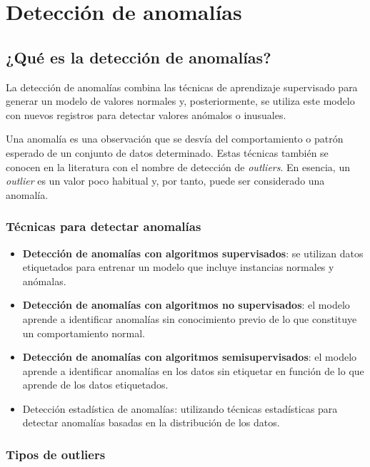 \chapter{Detección de anomalías}

\section{¿Qué es la detección de anomalías?}
 La detección de anomalías combina las técnicas de aprendizaje supervisado para generar un modelo de valores normales y, posteriormente, se utiliza este modelo con nuevos registros para detectar valores anómalos o inusuales.
 
 
Una anomalía es una observación que se desvía del comportamiento o patrón esperado de un conjunto de datos determinado. Estas técnicas también se conocen en la literatura con el nombre de detección de \textit{outliers}. En esencia, un \textit{outlier} es un valor poco habitual y, por tanto, puede ser considerado una anomalía.

\subsection{Técnicas para detectar anomalías}
\begin{itemize}
    \item \textbf{Detección de anomalías con algoritmos supervisados}: se utilizan datos etiquetados para entrenar un modelo que incluye instancias normales y anómalas.

    \item \textbf{Detección de anomalías con algoritmos no supervisados}: el modelo aprende a identificar anomalías sin conocimiento previo de lo que constituye un comportamiento normal.

    \item \textbf{Detección de anomalías con algoritmos semisupervisados}: el modelo aprende a identificar anomalías en los datos sin etiquetar en función de lo que aprende de los datos etiquetados.

    \item Detección estadística de anomalías: utilizando técnicas estadísticas para detectar anomalías basadas en la distribución de los datos.
\end{itemize}

\subsection{Tipos de outliers}

